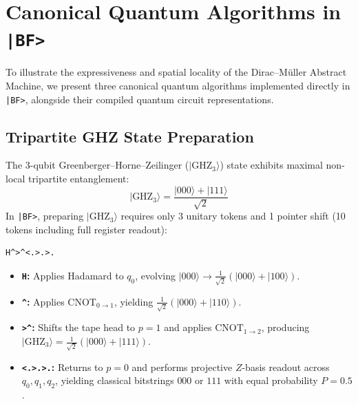 \documentclass[11pt,a4paper,twocolumn]{article}
\newcommand{\ket}[1]{| #1 \rangle}
\begin{document}
\section{Canonical Quantum Algorithms in \texttt{|BF>}}

To illustrate the expressiveness and spatial locality of the Dirac--M\"uller Abstract Machine, we present three canonical quantum algorithms implemented directly in \texttt{|BF>}, alongside their compiled quantum circuit representations.

\subsection{Tripartite GHZ State Preparation}
The 3-qubit Greenberger--Horne--Zeilinger ($\ket{\text{GHZ}_3}$) state \cite{greenberger1989ghz} exhibits maximal non-local tripartite entanglement:
\begin{equation}
    \ket{\text{GHZ}_3} = \frac{\ket{000} + \ket{111}}{\sqrt{2}}
\end{equation}
In \texttt{|BF>}, preparing $\ket{\text{GHZ}_3}$ requires only 3 unitary tokens and 1 pointer shift (10 tokens including full register readout):

\begin{lstlisting}[caption={3-Qubit GHZ preparation and readout in \texttt{|BF>}.}]
H^>^<.>.>.
\end{lstlisting}

\begin{itemize}
    \item \textbf{\texttt{H}:} Applies Hadamard to $q_0$, evolving $\ket{000} \to \frac{1}{\sqrt{2}}(\ket{000} + \ket{100})$.
    \item \textbf{\texttt{\^{}}:} Applies $\text{CNOT}_{0\to 1}$, yielding $\frac{1}{\sqrt{2}}(\ket{000} + \ket{110})$.
    \item \textbf{\texttt{>\^{}}:} Shifts the tape head to $p = 1$ and applies $\text{CNOT}_{1\to 2}$, producing $\ket{\text{GHZ}_3} = \frac{1}{\sqrt{2}}(\ket{000} + \ket{111})$.
    \item \textbf{\texttt{<.>.>.}:} Returns to $p = 0$ and performs projective $Z$-basis readout across $q_0, q_1, q_2$, yielding classical bitstrings $000$ or $111$ with equal probability $P = 0.5$.
\end{itemize}
\end{document}
